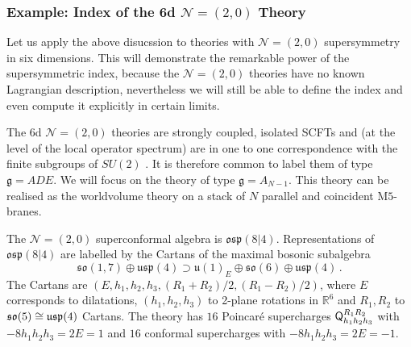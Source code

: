 \documentclass[main.tex]{subfiles}
\begin{document}
\subsubsection{Example: Index of the 6d $\mathcal{N}=(2,0)$ Theory}	\label{Chap:App6dhalfBPS}
Let us apply the above disucssion to theories with $\mathcal{N}=(2,0)$ supersymmetry in six dimensions.  This will demonstrate the remarkable power of the supersymmetric index, because the $\mathcal{N}=(2,0)$ theories have no known Lagrangian description, nevertheless we will still be able to define the index and even compute it explicitly in certain limits.   

The 6d $\mathcal{N}=(2,0)$ theories are strongly coupled, isolated SCFTs and (at the level of the local operator spectrum) are in one to one correspondence with the finite subgroups of $SU(2)$ \cite{Witten:1995zh,Hanany:2000fq,Seiberg:1996vs,Seiberg:1997zk,Witten:1995em,Strominger:1995ac,Witten:1995em,Aharony:1997an,Seiberg:1997ax}.  It is therefore common to label them of type $\mathfrak{g}=ADE$.  We will focus on the theory of type $\mathfrak{g}=A_{N-1}$.  This theory can be realised as the worldvolume theory on a stack of $N$ parallel and coincident M$5$-branes.

The $\mathcal{N}=(2,0)$ superconformal algebra is $\mathfrak{osp}(8|4)$.  Representations of $\mathfrak{osp}(8|4)$ are labelled by the Cartans of the maximal bosonic subalgebra
\begin{equation}
\mathfrak{so}(1,7)\oplus\mathfrak{usp}(4)\supset \mathfrak{u}(1)_E\oplus \mathfrak{so}(6)\oplus\mathfrak{usp}(4)\,.
\end{equation}
The Cartans are $(E,h_1,h_2,h_3,(R_1+R_2)/2,(R_1-R_2)/2)$, where $E$ corresponds to dilatations, $(h_1,h_2,h_3)$ to 2-plane rotations in $\mathbb{R}^6$ and $R_1,R_2$ to $\mathfrak{so}(5)\cong\mathfrak{usp}(4)$ Cartans.  
The theory has $16$ Poincar\'e supercharges $\mathsf{Q}^{R_1R_2}_{h_1h_2h_3}$ with $-8h_1h_2h_3=2E=1$ and $16$ conformal supercharges with $-8h_1h_2h_3=2E=-1$.
\end{document}
